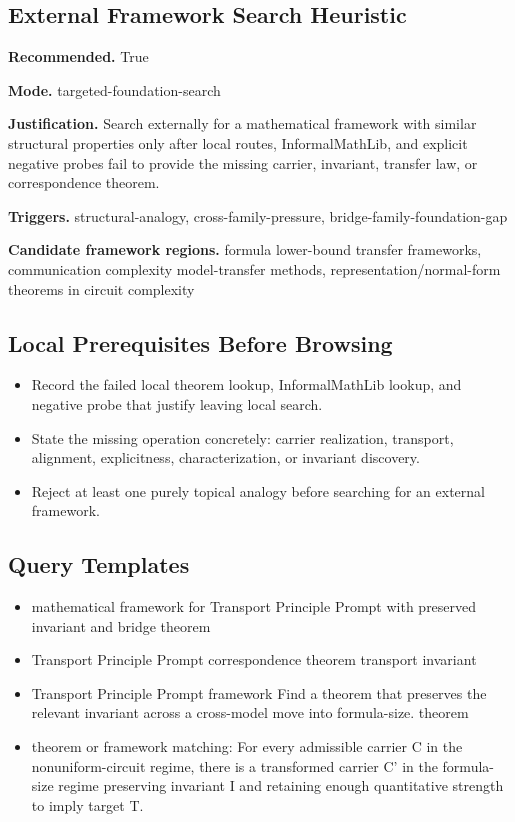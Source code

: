 \documentclass[11pt]{article}
\begin{document}
\subsection*{External Framework Search Heuristic}
\textbf{Recommended.} True

\textbf{Mode.} targeted-foundation-search

\textbf{Justification.} Search externally for a mathematical framework with similar structural properties only after local routes, InformalMathLib, and explicit negative probes fail to provide the missing carrier, invariant, transfer law, or correspondence theorem.

\textbf{Triggers.} structural-analogy, cross-family-pressure, bridge-family-foundation-gap

\textbf{Candidate framework regions.} formula lower-bound transfer frameworks, communication complexity model-transfer methods, representation/normal-form theorems in circuit complexity

\subsection*{Local Prerequisites Before Browsing}
\begin{itemize}[leftmargin=*,itemsep=0.2em]
\item Record the failed local theorem lookup, InformalMathLib lookup, and negative probe that justify leaving local search.
\item State the missing operation concretely: carrier realization, transport, alignment, explicitness, characterization, or invariant discovery.
\item Reject at least one purely topical analogy before searching for an external framework.
\end{itemize}
\subsection*{Query Templates}
\begin{itemize}[leftmargin=*,itemsep=0.2em]
\item mathematical framework for Transport Principle Prompt with preserved invariant and bridge theorem
\item Transport Principle Prompt correspondence theorem transport invariant
\item Transport Principle Prompt framework Find a theorem that preserves the relevant invariant across a cross-model move into formula-size. theorem
\item theorem or framework matching: For every admissible carrier C in the nonuniform-circuit regime, there is a transformed carrier C' in the formula-size regime preserving invariant I and retaining enough quantitative strength to imply target T.
\end{itemize}
\end{document}
